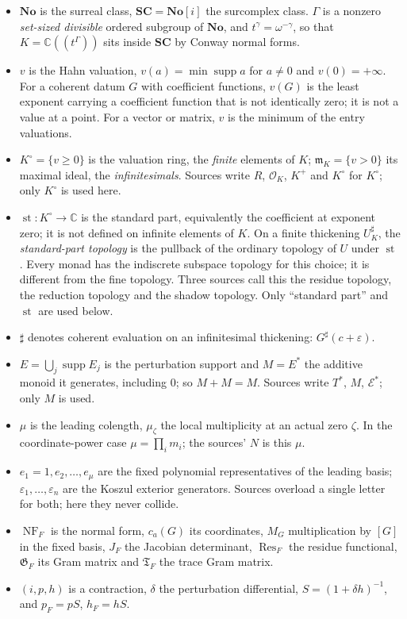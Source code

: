 \documentclass[11pt,letterpaper]{article}
\theoremstyle{definition}
\theoremstyle{remark}
\newcommand{\No}{\mathbf{No}}
\newcommand{\SC}{\mathbf{SC}}
\newcommand{\C}{\mathbb C}
\newcommand{\OO}{\mathcal O}
\newcommand{\mm}{\mathfrak m}
\newcommand{\Kc}{K^{\circ}}
\newcommand{\sh}{^{\sharp}}
\newcommand{\Gram}{\mathfrak G}
\newcommand{\TGram}{\mathfrak T}
\DeclareMathOperator{\supp}{supp}
\DeclareMathOperator{\st}{st}
\DeclareMathOperator{\NF}{NF}
\DeclareMathOperator{\Res}{Res}
\numberwithin{equation}{section}
\begin{document}
\begin{itemize}
\item $\No$ is the surreal class, $\SC=\No[i]$ the surcomplex class. $\Gamma$ is a nonzero \emph{set-sized divisible} ordered subgroup of $\No$, and $t^\gamma=\omega^{-\gamma}$, so that $K=\C((t^\Gamma))$ sits inside $\SC$ by Conway normal forms.
\item $v$ is the Hahn valuation, $v(a)=\min\supp a$ for $a\neq0$ and $v(0)=+\infty$. For a coherent datum $G$ with coefficient functions, $v(G)$ is the least exponent carrying a coefficient function that is not identically zero; it is not a value at a point. For a vector or matrix, $v$ is the minimum of the entry valuations.
\item $\Kc=\{v\geq0\}$ is the valuation ring, the \emph{finite} elements of $K$; $\mm_K=\{v>0\}$ its maximal ideal, the \emph{infinitesimals}. Sources write $R$, $\OO_K$, $K^+$ and $K^\circ$ for $\Kc$; only $\Kc$ is used here.
\item $\st:\Kc\to\C$ is the standard part, equivalently the coefficient at exponent zero; it is not defined on infinite elements of $K$. On a finite thickening $U\sh_K$, the \emph{standard-part topology} is the pullback of the ordinary topology of $U$ under $\st$. Every monad has the indiscrete subspace topology for this choice; it is different from the fine topology. Three sources call this the residue topology, the reduction topology and the shadow topology. Only ``standard part'' and $\st$ are used below.
\item $\sharp$ denotes coherent evaluation on an infinitesimal thickening: $G\sh(c+\varepsilon)$.
\item $E=\bigcup_j\supp E_j$ is the perturbation support and $M=E^*$ the additive monoid it generates, including $0$; so $M+M=M$. Sources write $T^*$, $M$, $\mathcal E^*$; only $M$ is used.
\item $\mu$ is the leading colength, $\mu_\zeta$ the local multiplicity at an actual zero $\zeta$. In the coordinate-power case $\mu=\prod_i m_i$; the sources' $N$ is this $\mu$.
\item $e_1=1,e_2,\ldots,e_\mu$ are the fixed polynomial representatives of the leading basis; $\varepsilon_1,\ldots,\varepsilon_n$ are the Koszul exterior generators. Sources overload a single letter for both; here they never collide.
\item $\NF_F$ is the normal form, $c_a(G)$ its coordinates, $M_G$ multiplication by $[G]$ in the fixed basis, $J_F$ the Jacobian determinant, $\Res_F$ the residue functional, $\Gram_F$ its Gram matrix and $\TGram_F$ the trace Gram matrix.
\item $(i,p,h)$ is a contraction, $\delta$ the perturbation differential, $S=(1+\delta h)^{-1}$, and $p_F=pS$, $h_F=hS$.
\end{itemize}
\end{document}

